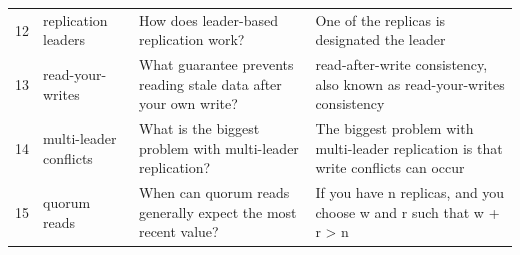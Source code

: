 \begin{table}[htbp]
\begin{tabular}{r p{2.4cm} p{4.4cm} p{6.0cm}}
12 & replication leaders & How does leader-based replication work? & One of the replicas is designated the leader \\
13 & read-your-writes & What guarantee prevents reading stale data after your own write? & read-after-write consistency, also known as read-your-writes consistency \\
14 & multi-leader conflicts & What is the biggest problem with multi-leader replication? & The biggest problem with multi-leader replication is that write conflicts can occur \\
15 & quorum reads & When can quorum reads generally expect the most recent value? & If you have n replicas, and you choose w and r such that w + r > n \\
\bottomrule
\end{tabular}
\end{table}

